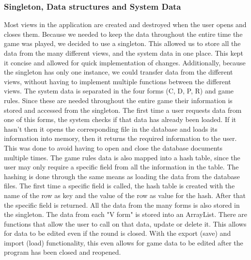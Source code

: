 \documentclass{l3proj}
\begin{document}
\subsubsection{Singleton, Data structures and System Data}
Most views in the application are created and destroyed when the user opens and closes them. Because we needed to keep the data throughout the entire time the game was played, we decided to use a singleton. This allowed us to store all the data from the many different views, and the system data in one place. This kept it concise and allowed for quick implementation of changes. Additionally, because the singleton has only one instance, we could transfer data from the different views, without having to implement multiple functions between the different views. 
The system data is separated in the four forms (C, D, P, R) and game rules. Since these are needed throughout the entire game their information is stored and accessed from the singleton. The first time a user requests data from one of this forms, the system checks if that data has already been loaded. If it hasn't then it opens the corresponding file in the database and loads its information into memory, then it returns the required information to the user. This was done to avoid having to open and close the database documents multiple times. 
The game rules data is also mapped into a hash table, since the user may only require a specific field from all the information in the table. The hashing is done through the same means as loading the data from the database files. The first time a specific field is called, the hash table is created with the name of the row as key and the value of the row as value for the hash. After that the specific field is returned.
All the data from the many forms is also stored in the singleton. The data from each "V form" is stored into an ArrayList. There are functions that allow the user to call on that data, update or delete it. This allows for data to be edited even if the round is closed. With the export (save) and import (load) functionality, this even allows for game data to be edited after the program has been closed and reopened.
\end{document}
